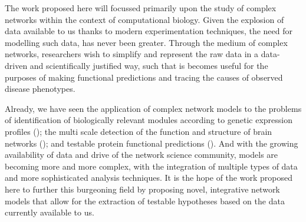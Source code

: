 \documentclass[
11pt, %
english, %
singlespacing, %
headsepline, %
]{MastersDoctoralThesis} %
\begin{document}
The work proposed here will focussed primarily upon the study of complex networks within the context of computational biology. Given the explosion of data available to us thanks to modern experimentation techniques, the need for modelling such data, has never been greater. Through the medium of complex networks, researchers wish to simplify and represent the raw data in a data-driven and scientifically justified way, such that is becomes useful for the purposes of making functional predictions and tracing the causes of observed disease phenotypes. 

Already, we have seen the application of complex network models to the problems of identification of biologically relevant modules according to genetic expression profiles (\cite{ideker2002discovering}); the multi scale detection of the function and structure of brain networks (\cite{ashourvan2017multi}); and testable protein functional predictions (\cite{palla2005uncovering,zhang2016integrated}). And with the growing availability of data and drive of the network science community, models are becoming more and more complex, with the integration of multiple types of data and more sophisticated analysis techniques. It is the hope of the work proposed here to further this burgeoning field by proposing novel, integrative network models that allow for the extraction of testable hypotheses based on the data currently available to us.


%
%
%
%
%
%
\end{document}
